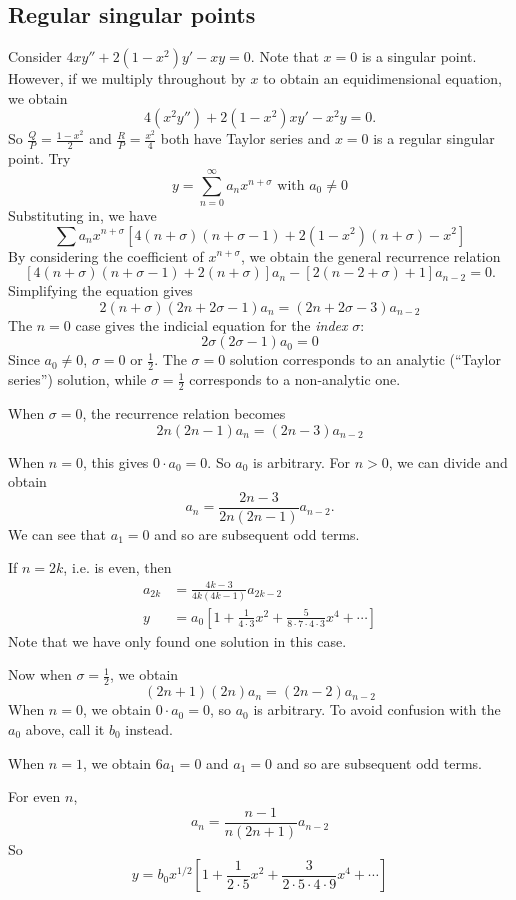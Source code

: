 \documentclass[a4paper]{article}
\begin{document}
\subsection{Regular singular points}
\begin{eg}
  Consider $4xy'' + 2(1 - x^2)y' - xy = 0$. Note that $x = 0$ is a singular point. However, if we multiply throughout by $x$ to obtain an equidimensional equation, we obtain
\[
4(x^2 y'') + 2(1 - x^2)xy' - x^2 y = 0.
\]
So $\frac{Q}{P} = \frac{1 - x^2}{2}$ and $\frac{R}{P} = \frac{x^2}{4}$ both have Taylor series and $x = 0$ is a regular singular point. Try
\[
y = \sum_{n = 0}^\infty a_n x^{n + \sigma}\text{ with }a_0 \not= 0
\]
Substituting in, we have
\[
\sum a_n x^{n + \sigma}[4(n + \sigma)(n + \sigma - 1) + 2(1 - x^2)(n + \sigma) - x^2]
\]
By considering the coefficient of $x^{n + \sigma}$, we obtain the general recurrence relation
\[
[4(n + \sigma)(n + \sigma - 1) + 2(n + \sigma)]a_n -[2(n - 2 + \sigma) + 1]a_{n - 2} = 0.
\]
Simplifying the equation gives
\[
2(n + \sigma)(2n + 2\sigma - 1)a_n = (2n + 2\sigma-3)a_{n - 2}
\]
The $n = 0$  case gives the indicial equation for the \emph{index} $\sigma$:
\[
2\sigma(2\sigma - 1)a_0 = 0
\]
Since $a_0 \not= 0$, $\sigma = 0$ or $\frac{1}{2}$. The $\sigma = 0$ solution corresponds to an analytic (``Taylor series'') solution, while $\sigma = \frac{1}{2}$ corresponds to a non-analytic one.

When $\sigma = 0$, the recurrence relation becomes
\[
2n(2n - 1)a_n = (2n - 3)a_{n - 2}
\]

When $n = 0$, this gives $0\cdot a_0 = 0$. So $a_0$ is arbitrary. For $n >0$, we can divide and obtain
\[
a_n = \frac{2n - 3}{2n(2n - 1)}a_{n - 2}.
\]
We can see that $a_1 = 0$ and so are subsequent odd terms.

If $n = 2k$, i.e. is even, then
\begin{align*}
  a_{2k} &= \frac{4k - 3}{4k(4k - 1)}a_{2k - 2}\\
  y &= a_0\left[1 + \frac{1}{4\cdot 3}x^2 + \frac{5}{8\cdot 7\cdot 4\cdot 3}x^4 + \cdots\right]
\end{align*}
Note that we have only found one solution in this case.

Now when $\sigma = \frac{1}{2}$, we obtain
\[
(2n + 1)(2n)a_n = (2n - 2)a_{n - 2}
\]
When $n = 0$, we obtain $0\cdot a_0 = 0$, so $a_0$ is arbitrary. To avoid confusion with the $a_0$ above, call it $b_0$ instead.

When $n = 1$, we obtain $6a_1 = 0$ and $a_1 = 0$ and so are subsequent odd terms.

For even $n$,
\[
a_n = \frac{n - 1}{n(2n + 1)}a_{n - 2}
\]
So 
\[
y = b_0 x^{1/2}\left[1 + \frac{1}{2\cdot 5}x^2 + \frac{3}{2\cdot 5\cdot 4\cdot 9}x^4 + \cdots\right]
\]
\end{eg}
\end{document}
